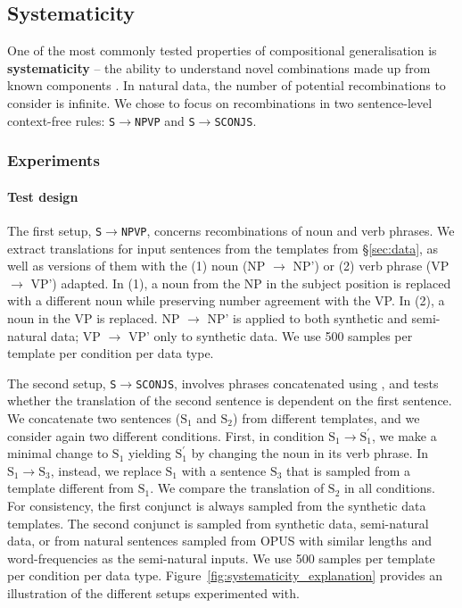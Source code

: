 \subsection{Systematicity}
\label{subsec:systematicity}

One of the most commonly tested properties of compositional generalisation is \textbf{systematicity} -- the ability to understand novel combinations made up from known components \citep[most famously,][]{lake2018generalization}.
In natural data, the number of potential recombinations to consider is infinite.
We chose to focus on recombinations in two sentence-level context-free rules: \texttt{S\;$\rightarrow$\;NP\;VP} and \texttt{S\;$\rightarrow$\;S\;CONJ\;S}.

\subsubsection{Experiments}
\paragraph{Test design}
\label{subsec:systematicity_test_design}
The first setup, \texttt{S\;$\rightarrow$\;NP\;VP}, concerns recombinations of noun and verb phrases.
We extract translations for input sentences from the templates from \S\ref{sec:data}, as well as versions of them with the (1) noun (NP $\rightarrow$ NP') or (2) verb phrase (VP $\rightarrow$ VP') adapted.
In (1), a noun from the NP in the subject position is replaced with a different noun while preserving number agreement with the VP.
In (2), a noun in the VP is replaced.
NP $\rightarrow$ NP' is applied to both synthetic and semi-natural data; VP $\rightarrow$ VP' only to synthetic data.
We use 500 samples per template per condition per data type.

The second setup, \texttt{S\;$\rightarrow$\;S\;CONJ\;S}, involves phrases concatenated using , and tests whether the translation of the second sentence is dependent on the first sentence.
We concatenate two sentences ($\text{S}_1$ and $\text{S}_2$) from different templates, and we consider again two different conditions.
First, in condition $\text{S}_1\rightarrow\text{S}^\prime_1$, we make a minimal change to $\text{S}_1$ yielding $\text{S}^\prime_1$ by changing the noun in its verb phrase.
In $\text{S}_1\rightarrow\text{S}_3$, instead, we replace $\text{S}_1$ with a sentence $\text{S}_3$ that is sampled from a template different from $\text{S}_1$.
We compare the translation of $\text{S}_2$ in all conditions.
For consistency, the first conjunct is always sampled from the synthetic data templates. 
The second conjunct is sampled from synthetic data, semi-natural data, or from natural sentences sampled from \textsc{OPUS} with similar lengths and word-frequencies as the semi-natural inputs.
We use 500 samples per template per condition per data type.
Figure~\ref{fig:systematicity_explanation} provides an illustration of the different setups experimented with.

